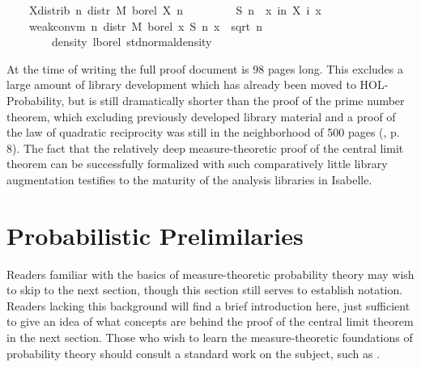 \documentclass{article}
\theoremstyle{definition}
\begin{document}
\begin{isabellebody}
\ \ \ \ X{\isacharunderscore}distrib{\isacharcolon}\ {\isachardoublequoteopen}{\isasymAnd}n{\isachardot}\ distr\ M\ borel\ {\isacharparenleft}X\ n{\isacharparenright}\ {\isacharequal}\ {\isasymmu}{\isachardoublequoteclose}\isanewline
\ \ \isanewline
\ \ \ \ {\isachardoublequoteopen}S\ n\ {\isasymequiv}\ {\isasymlambda}x{\isachardot}\ {\isasymSum}i{\isacharless}n{\isachardot}\ X\ i\ x{\isachardoublequoteclose}\isanewline
\ \ \isanewline
\ \ \ \ {\isachardoublequoteopen}weak{\isacharunderscore}conv{\isacharunderscore}m\ {\isacharparenleft}{\isasymlambda}n{\isachardot}\ distr\ M\ borel\ {\isacharparenleft}{\isasymlambda}x{\isachardot}\ S\ n\ x\ {\isacharslash}\ sqrt\ {\isacharparenleft}n\ {\isacharasterisk}\ {\isasymsigma}\ \isanewline
\ \ \ \ \ \ \ \ {\isacharparenleft}density\ lborel\ std{\isacharunderscore}normal{\isacharunderscore}density{\isacharparenright}{\isachardoublequoteclose}
\end{isabellebody}

\medskip

At the time of writing the full proof document is 98 pages long. This excludes a large amount of library development which has already been moved to HOL-Probability, but is still dramatically shorter than the proof of the prime number theorem, which excluding previously developed library material and a proof of the law of quadratic reciprocity was still in the neighborhood of 500 pages (\cite{avigad-etal-pnt}, p. 8). The fact that the relatively deep measure-theoretic proof of the central limit theorem can be successfully formalized with such comparatively little library augmentation testifies to the maturity of the analysis libraries in Isabelle.

\section{Probabilistic Prelimilaries}

Readers familiar with the basics of measure-theoretic probability theory may wish to skip to the next section, though this section still serves to establish notation. Readers lacking this background will find a brief introduction here, just sufficient to give an idea of what concepts are behind the proof of the central limit theorem in the next section. Those who wish to learn the measure-theoretic foundations of probability theory should consult a standard work on the subject, such as \cite{billingsley}.
\end{document}
